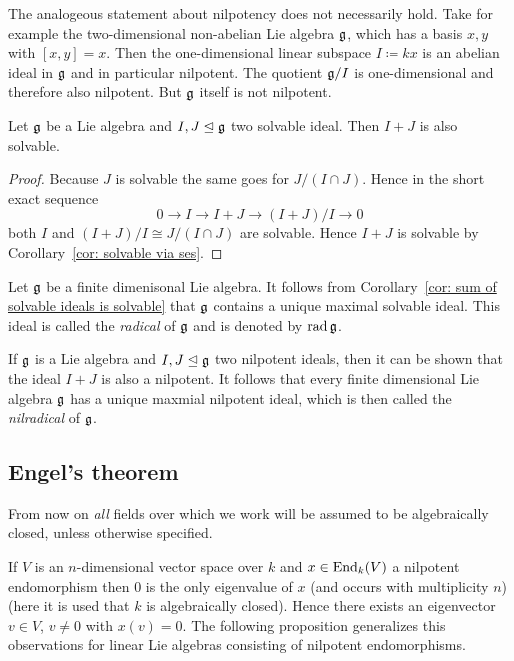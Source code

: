 \begin{rem}
 The analogeous statement about nilpotency does not necessarily hold. Take for example the two-dimensional non-abelian Lie algebra $\mathfrak{g}$, which has a basis $x,y$ with $[x,y] = x$. Then the one-dimensional linear subspace $I \coloneqq kx$ is an abelian ideal in $\mathfrak{g}$ and in particular nilpotent. The quotient $\mathfrak{g}/I$ is one-dimensional and therefore also nilpotent. But $\mathfrak{g}$ itself is not nilpotent.
\end{rem}


\begin{cor}\label{cor: sum of solvable ideals is solvable}
 Let $\mathfrak{g}$ be a Lie algebra and $I, J \trianglelefteq \mathfrak{g}$ two solvable ideal. Then $I + J$ is also solvable.
\end{cor}
\begin{proof}
 Because $J$ is solvable the same goes for $J/(I \cap J)$. Hence in the short exact sequence
 \[
  0 \to I \to I+J \to (I+J)/I \to 0
 \]
 both $I$ and $(I+J)/I \cong J/(I \cap J)$ are solvable. Hence $I+J$ is solvable by Corollary~\ref{cor: solvable via ses}.
\end{proof}


\begin{defi}
 Let $\mathfrak{g}$ be a finite dimenisonal Lie algebra. It follows from Corollary~\ref{cor: sum of solvable ideals is solvable} that $\mathfrak{g}$ contains a unique maximal solvable ideal. This ideal is called the \emph{radical} of $\mathfrak{g}$ and is denoted by $\operatorname{rad} \mathfrak{g}$.
\end{defi}


\begin{rem}
 If $\mathfrak{g}$ is a Lie algebra and $I, J \trianglelefteq \mathfrak{g}$ two nilpotent ideals, then it can be shown that the ideal $I + J$ is also a nilpotent. It follows that every finite dimensional Lie algebra $\mathfrak{g}$ has a unique maxmial nilpotent ideal, which is then called the \emph{nilradical} of $\mathfrak{g}$.
\end{rem}







\subsection{Engel’s theorem}


From now on \emph{all} fields over which we work will be assumed to be algebraically closed, unless otherwise specified.


If $V$ is an $n$-dimensional vector space over $k$ and $x \in \operatorname{End}_k(V)$ a nilpotent endomorphism then $0$ is the only eigenvalue of $x$ (and occurs with multiplicity $n$) (here it is used that $k$ is algebraically closed). Hence there exists an eigenvector $v \in V$, $v \neq 0$ with $x(v) = 0$. The following proposition generalizes this observations for linear Lie algebras consisting of nilpotent endomorphisms.


